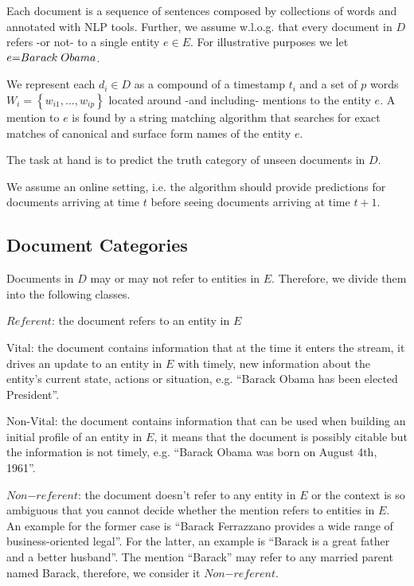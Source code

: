 \documentclass{article}
\begin{document}
Each document is a sequence of sentences composed by collections of words and annotated with NLP tools.
Further, we assume w.l.o.g. that every document in $D$ refers -or not- to a single entity $e \in E$. For illustrative purposes we let $e\mathord{=}Barack\hspace{1mm}Obama$.

We represent each $d_i \in D$ as a compound of a timestamp $t_i$ and a set of $p$ words $W_i = \left\{ {w_{i1}, ..., w_{ip}}\right\}$ located around -and including- mentions to the entity $e$. A mention to $e$ is found by a string matching algorithm that searches for exact matches of canonical and surface form names of the entity $e$.

The task at hand is to predict the truth category of unseen documents in $D$.

We assume an online setting, i.e. the algorithm should provide predictions for documents arriving at time $t$ before seeing documents arriving at time $t+1$. 

\subsection{Document Categories}
\label{categories}

Documents in $D$ may or may not refer to entities in $E$. Therefore, we divide them into the following classes.

\begin{itemize*}
  \item $Referent$: the document refers to an entity in $E$
    \begin{itemize*}
      \item Vital: the document contains information that at the time it enters the stream, it drives an update to an entity in $E$ with timely, new information about the entity's current state, actions or situation, e.g. ``Barack Obama has been elected President''.
      \item Non-Vital: the document contains information that can be used when building an initial profile of an entity in $E$, it means that the document is possibly citable but the information is not timely, e.g. ``Barack Obama was born on August 4th, 1961''.
    \end{itemize*}
  \item $Non\mathord{-}referent$: the document doesn't refer to any entity in $E$ or the context is so ambiguous that you cannot decide whether the mention refers to entities in $E$. An example for the former case is ``Barack Ferrazzano provides a wide range of business-oriented legal''. For the latter, an example is ``Barack is a great father and a better husband''. The mention ``Barack'' may refer to any married parent named Barack, therefore, we consider it $Non\mathord{-}referent$.

\end{itemize*}
\end{document}

